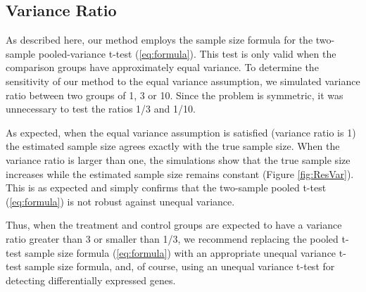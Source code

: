 \documentclass{bioinfo}
\begin{document}
\subsection{Variance Ratio}

As described here, our method employs the sample size formula for
the two-sample pooled-variance t-test (\ref{eq:formula}).  This test
is only valid when the comparison groups have approximately equal
variance. To determine the sensitivity of our method to the equal
variance assumption, we simulated variance ratio between two groups
of 1, 3 or 10.  Since the problem is symmetric, it was unnecessary
to test the ratios 1/3 and 1/10.

As expected, when the equal variance assumption is satisfied
(variance ratio is 1) the estimated sample size agrees exactly
with the true sample size. When the variance ratio is larger than
one, the simulations show that the true sample size increases
while the estimated sample size remains constant (Figure
\ref{fig:ResVar}).   This is as expected and simply confirms that
the two-sample pooled t-test (\ref{eq:formula}) is not robust
against unequal variance.

Thus, when the treatment and control groups are expected to have a
variance ratio greater than 3 or smaller than 1/3, we recommend
replacing the pooled t-test sample size formula (\ref{eq:formula})
with an appropriate unequal variance t-test sample size formula,
and, of course, using an unequal variance t-test for detecting
differentially expressed genes.
\end{document}
